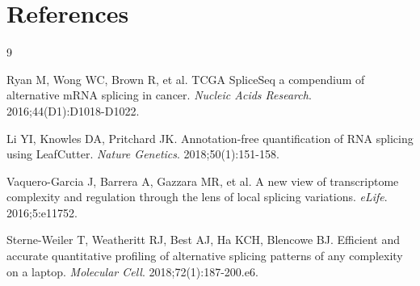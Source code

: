 \documentclass[11pt]{article}
\begin{document}
\section*{References}
\begin{thebibliography}{9}

Ryan M, Wong WC, Brown R, et al.
TCGA SpliceSeq a compendium of alternative mRNA splicing in cancer.
\emph{Nucleic Acids Research}. 2016;44(D1):D1018-D1022.

Li YI, Knowles DA, Pritchard JK.
Annotation-free quantification of RNA splicing using LeafCutter.
\emph{Nature Genetics}. 2018;50(1):151-158.

Vaquero-Garcia J, Barrera A, Gazzara MR, et al.
A new view of transcriptome complexity and regulation through the lens of local splicing variations.
\emph{eLife}. 2016;5:e11752.

Sterne-Weiler T, Weatheritt RJ, Best AJ, Ha KCH, Blencowe BJ.
Efficient and accurate quantitative profiling of alternative splicing patterns of any complexity on a laptop.
\emph{Molecular Cell}. 2018;72(1):187-200.e6.

\end{thebibliography}
\end{document}
